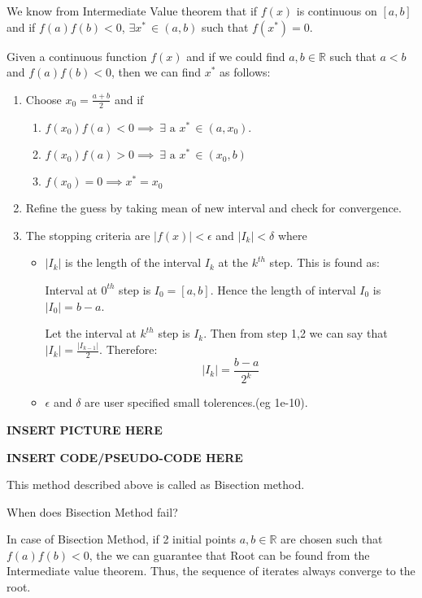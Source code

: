 \documentclass[
]{book}
\begin{document}
We know from Intermediate Value theorem that if \(f(x)\) is continuous on \([a,b]\) and if \(f(a) f(b)<0\), \(\exists x^* \, \in(a,b)\) such that \(f(x^*)=0\).

Given a continuous function \(f(x)\) and if we could find \(a,b\in \mathbb{R}\) such that \(a<b\) and \(f(a) f(b)<0\), then we can find \(x^*\) as follows:

\begin{enumerate}
\def\labelenumi{\arabic{enumi}.}
\item
  Choose \(x_0 = \frac{a+b}{2}\) and if

  \begin{enumerate}
  \def\labelenumii{\alph{enumii}.}
  \item
    \(f(x_0) f(a)<0 \implies \ \exists \text{ a } x^*\, \in (a,x_0)\).
  \item
    \(f(x_0) f(a)>0 \implies \ \exists \text{ a } x^*\, \in (x_0,b)\)
  \item
    \(f(x_0) =0 \implies x^* = x_0\)
  \end{enumerate}
\item
  Refine the guess by taking mean of new interval and check for convergence.
\item
  The stopping criteria are \(|f(x)|<\epsilon\) and \(|I_k|<\delta\) where

  \begin{itemize}
  \item
    \(|I_k|\) is the length of the interval \(I_k\) at the \(k^{th}\) step. This is found as:

    Interval at \(0^{th}\) step is \(I_0 = [a,b]\). Hence the length of interval \(I_0\) is \(|I_0|= b-a\).

    Let the interval at \(k^{th}\) step is \(I_k\). Then from step 1,2 we can say that \(|I_k| = \frac{|I_{k-1}|}{2}\). Therefore: \[|I_k| = \frac{b-a}{2^k}\]
  \item
    \(\epsilon\) and \(\delta\) are user specified small tolerences.(eg 1e-10).
  \end{itemize}
\end{enumerate}

\textbf{INSERT PICTURE HERE}

\textbf{INSERT CODE/PSEUDO-CODE HERE}

This method described above is called as Bisection method.

When does Bisection Method fail?

In case of Bisection Method, if 2 initial points \(a,b \in \mathbb{R}\) are chosen such that \(f(a)f(b)<0\), the we can guarantee that Root can be found from the Intermediate value theorem. Thus, the sequence of iterates always converge to the root.
\end{document}
